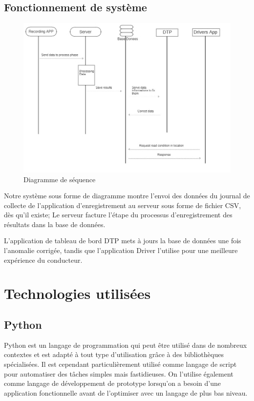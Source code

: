 \subsection{Fonctionnement de système}
\begin{figure}[ht]
    \center
    \includegraphics[width=1.2\textwidth]{Images/chapter3/diagrameSequence.jpg}
    \caption{Diagramme de séquence}
    \label{fig:System}
\end{figure}

Notre système sous forme de diagramme montre l'envoi des données du journal de collecte de l'application d'enregistrement au serveur sous forme de fichier CSV, dès qu'il existe; Le serveur facture l'étape du processus d'enregistrement des résultats dans la base de données.

L'application de tableau de bord DTP mets à jours la base de données une fois l'anomalie corrigée, tandis que l'application Driver l'utilise pour une meilleure expérience du conducteur.



\section{Technologies utilisées}
\subsection{Python}
Python \cite{WelcomePythonOrg} est un langage de programmation qui peut être utilisé dans de nombreux contextes et est adapté à tout type d'utilisation grâce à des bibliothèques spécialisées. Il est cependant particulièrement utilisé comme langage de script pour automatiser des tâches simples mais fastidieuses. On l'utilise également comme langage de développement de prototype lorsqu'on a besoin d'une application fonctionnelle avant de l'optimiser avec un langage de plus bas niveau.

